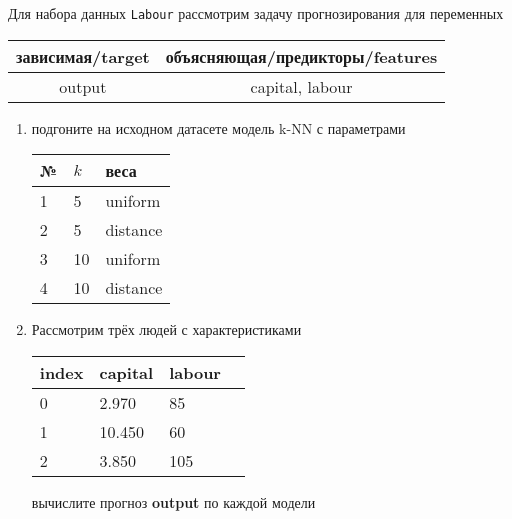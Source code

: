 \begin{exercise}
Для набора данных \texttt{Labour} рассмотрим задачу прогнозирования
для переменных
\begin{center}
	\begin{tabular}{|c|c|}\hline
		зависимая/target & объясняющая/предикторы/features \\ \hline
		output & capital, labour \\ \hline
	\end{tabular}
\end{center}
\begin{enumerate}
	\item подгоните на исходном датасете модель k-NN с параметрами
	\begin{center}
		\begin{tabular}{|l|l|l|}\hline
		№ & \(k\) & веса \\ \hline
		1 & 5 & uniform \\
		2 & 5 & distance \\
		3 & 10 & uniform \\
		4 & 10 & distance \\ \hline
		\end{tabular}
	\end{center}
	\item Рассмотрим трёх людей с характеристиками
	\begin{center}
		\begin{tabular}{|l||l||l|l|}\hline
			index & capital & labour \\ \hline\hline
			0 & 2.970 & 85 \\
			1 & 10.450 & 60  \\
			2 & 3.850 & 105 \\ \hline
		\end{tabular}
	\end{center}
	вычислите прогноз \textbf{output} по каждой модели
\end{enumerate}
\end{exercise}

